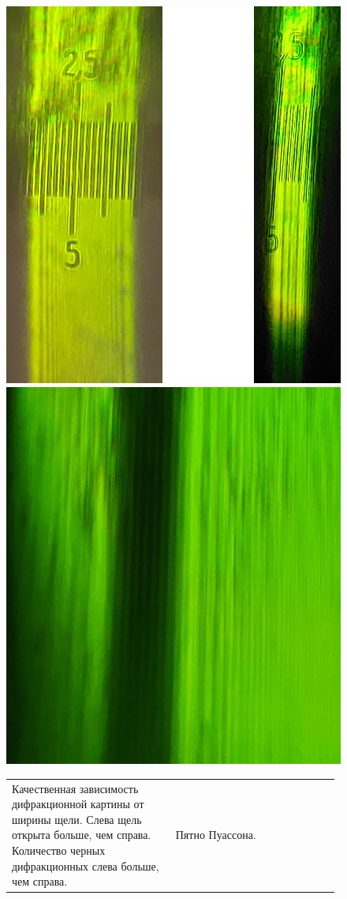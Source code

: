 \begin{figure}[h]
	\begin{minipage}[h]{0.49 \linewidth}
		\centering
		\includegraphics[width=0.8\linewidth]{../Изображения/Качественно Френель размер щели.png}
		\caption{}
		\label{img:Fresnel-diffraction-quality}
	\end{minipage}
	\hfill
	\begin{minipage}[h]{0.49 \linewidth}
		\centering
		\includegraphics[width=0.8\linewidth]{../Изображения/Пятно Пуассона2.png}
		\caption{}
		\label{img:Poisson-spot}
	\end{minipage}
	\begin{tabular}{p{0.49\linewidth}p{0.49\linewidth}}
		Качественная зависимость дифракционной картины от ширины щели. Слева щель открыта больше, чем справа. Количество черных дифракционных слева больше, чем справа. &
		\centering
		Пятно Пуассона. \\
	\end{tabular}
\end{figure}

